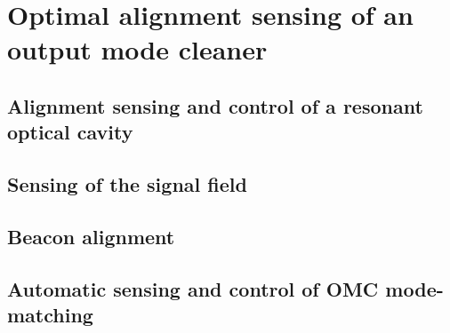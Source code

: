 \chapter{Optimal alignment sensing of an output mode cleaner}

\section{Alignment sensing and control of a resonant optical cavity}

\section{Sensing of the signal field}

\section{Beacon alignment}

\section{Automatic sensing and control of OMC mode-matching}

